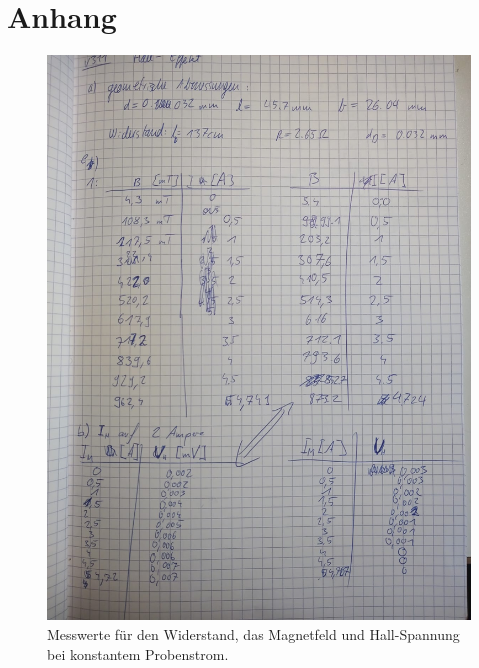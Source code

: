 \section{Anhang}

\begin{figure}
 \centering
 \caption{Messwerte für den Widerstand, das Magnetfeld und Hall-Spannung bei konstantem Probenstrom.}
 \includegraphics[width=\textwidth]{hallwerte1.jpeg}
\end{figure}

